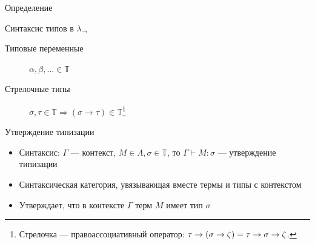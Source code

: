 
    \begin{frame}{Определение \secname}
        \vspace{-0.5em}
        \pause
        \begin{block}{Синтаксис типов в $\lambda_{\rightarrow}$}
            \begin{description}
                \item[Типовые переменные] \vspace{-1em} $\alpha, \beta, \ldots \in \mathbb{T}$
                \hspace{2em}
                \item[Стрелочные типы] \vspace{-2em} $\sigma, \tau \in \mathbb{T} \Rightarrow (\sigma\rightarrow\tau)\in\mathbb{T}$\footnote{Стрелочка --- правоассоциативный оператор: $\tau \to (\sigma \to \zeta) = \tau \to \sigma \to \zeta$.}
                \hspace{2em}
            \end{description}
        \end{block}
        \pause
        \begin{block}{Утверждение типизации}
            \begin{itemize}
                \item Синтаксис: $\Gamma$ --- контекст, $M \in \Lambda, \sigma \in \mathbb{T}$, то $\Gamma \vdash M : \sigma$ --- утверждение типизации
                \item Синтаксическая категория, увязывающая вместе термы и типы с контекстом
                \item Утверждает, что в контексте $\Gamma$ терм $M$ имеет тип $\sigma$
            \end{itemize}
        \end{block}

\end{frame}
